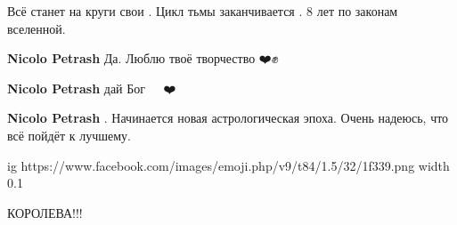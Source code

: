 \begin{itemize}
Всё станет на круги свои . Цикл тьмы заканчивается . 8 лет по законам вселенной.

\begin{itemize}
 
\textbf{Nicolo Petrash} Да. Люблю твоё творчество ❤️✊🙏

 
\textbf{Nicolo Petrash} дай Бог 🙏🙏🙏🙏❤️

 
\textbf{Nicolo Petrash} .
Начинается новая астрологическая эпоха. Очень надеюсь, что всё пойдёт к лучшему.🙏
\end{itemize}

 

\ifcmt
  ig https://www.facebook.com/images/emoji.php/v9/t84/1.5/32/1f339.png
  width 0.1
\fi

 

КОРОЛЕВА!!!👏👏👏

\begin{itemize}
 

\end{itemize}
\end{itemize}
